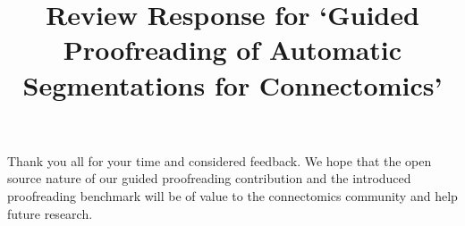 \documentclass[10pt,twocolumn,letterpaper]{article}
\begin{document}
\title{\vspace{-0.5cm}Review Response for `Guided Proofreading of Automatic Segmentations for Connectomics'}  %

\maketitle
\thispagestyle{empty}

\noindent Thank you all for your time and considered feedback. We hope that the open source nature of our guided proofreading contribution and the introduced proofreading benchmark will be of value to the connectomics community and help future research.

%
%

\end{document}
